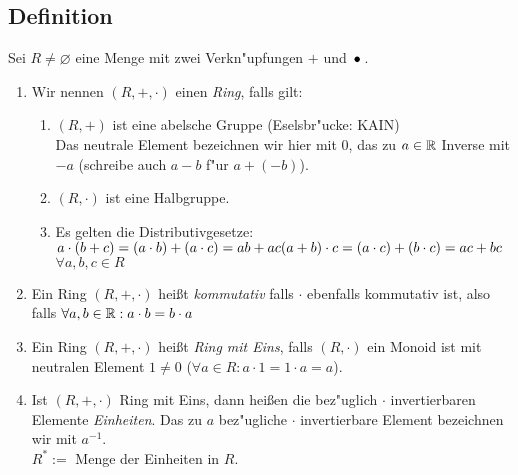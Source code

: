 \subsection[Definition: Ring]{Definition} \label{ring}
Sei $R \neq \varnothing$ eine Menge mit zwei Verkn"upfungen $+$ und $\,{\bullet}\,$.
{\renewcommand{\labelenumi}{(\roman{enumi})}
\begin{enumerate}
	\item
	Wir nennen $(R, +, \cdot)$ einen \emph{Ring}, falls gilt:
	{\renewcommand{\labelenumi}{\arabic{enumi})}\begin{enumerate}
		\item
		$(R,+)$ ist eine abelsche Gruppe (Eselsbr"ucke: KAIN)\\
		Das neutrale Element bezeichnen wir hier mit $0$, das zu $a \in \mathbb{R}$ Inverse mit $-a$ (schreibe auch $a-b$ f"ur $a+(-b)$).
		\item
		$(R,\cdot)$ ist eine Halbgruppe.
		\item
		Es gelten die Distributivgesetze:\\
		$a\cdot (b+c) = (a \cdot b) + (a \cdot c) = ab + ac\\
		(a+b) \cdot c = (a \cdot c) + (b \cdot c) = ac + bc$ \qquad $\forall a, b, c \in R$
	\end{enumerate}}
	\item
	Ein Ring $(R,+, \cdot)$ heißt \emph{kommutativ} falls $\cdot$ ebenfalls kommutativ ist, also falls ${\forall a,b \in \mathbb{R}: a \cdot b = b \cdot a}$
	\item
	Ein Ring $(R,+, \cdot)$ heißt \emph{Ring mit Eins}, falls $(R, \cdot)$ ein Monoid ist mit neutralen Element $1\neq 0$ \;($\forall a \in R: a \cdot 1 = 1 \cdot a = a$).
	\item
	Ist $(R, +, \cdot)$ Ring mit Eins, dann heißen die bez"uglich $\cdot$ invertierbaren Elemente \emph{Einheiten}. Das zu $a$ bez"ugliche $\cdot$
	invertierbare Element bezeichnen wir mit $a^{-1}$.\\ $R^* :=$ Menge der Einheiten in $R$.
\end{enumerate}}

